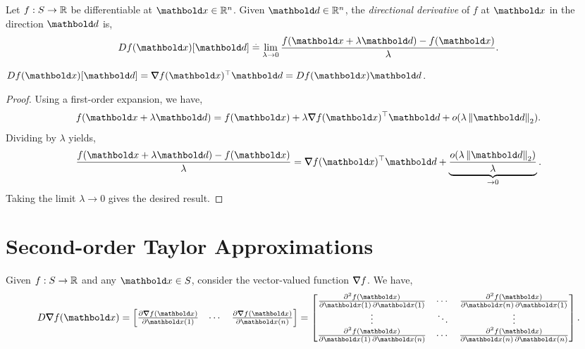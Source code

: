 \begin{defn} Let $f: S \to \mathbb{R}$ be differentiable at $\vx \in \R^n$. Given $\vd \in \R^n$, the \emph{directional derivative} of $f$ at $\vx$ in the direction $\vd$ is, \begin{align}
    D f(\vx)[\vd] \defeq \lim_{\lambda \to 0} \frac{f(\vx + \lambda\vd) - f(\vx)}{\lambda}.
\end{align}
\end{defn}

\begin{lem} $D f(\vx)[\vd] = \trans{\grad f(\vx)}\vd = D f(\vx) \vd$.
\end{lem}
\begin{proof} Using a first-order expansion, we have, \begin{align*}
    f(\vx + \lambda\vd) = f(\vx) + \lambda \trans{\grad f(\vx)}\vd + o(\lambda \norm{\vd}_2).
\end{align*} Dividing by $\lambda$ yields, \begin{align*}
    \frac{f(\vx + \lambda\vd) - f(\vx)}{\lambda} = \trans{\grad f(\vx)}\vd + \underbrace{\frac{o(\lambda\norm{\vd}_2)}{\lambda}}_{\to 0}.
\end{align*} Taking the limit $\lambda \to 0$ gives the desired result.
\end{proof}

\section{Second-order Taylor Approximations}
\begin{ex}
Given $f: S \to \mathbb{R}$ and any $\vx \in \sS$, consider the vector-valued function $\nabla\!\!\!\!\!\nabla f$. We have, \begin{align}
    D \grad f(\vx) = \begin{bmatrix}
        \pdv{\grad f(\vx)}{\vx(1)} & \cdots & \pdv{\grad f(\vx)}{\vx(n)}
    \end{bmatrix} = \begin{bmatrix}
        \pdv{f(\vx)}{\vx(1),\vx(1)} & \cdots & \pdv{f(\vx)}{\vx(n),\vx(1)} \\
        \vdots & \ddots & \vdots \\
        \pdv{f(\vx)}{\vx(1),\vx(n)} & \cdots & \pdv{f(\vx)}{\vx(n),\vx(n)}
    \end{bmatrix}. \label{eq:jacobian_hessian}
\end{align}
\end{ex}

